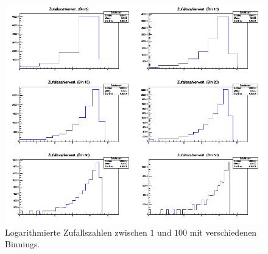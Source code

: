 \begin{itemize}
\begin{figure}
\centering
\includegraphics[width=\textwidth]{Log_ZufallszahlenverteilungBinnings2x3.png}
\caption{Logarithmierte Zufallszahlen zwischen $1$ und $100$ mit verschiedenen Binnings.}
\end{figure}

\end{itemize}
